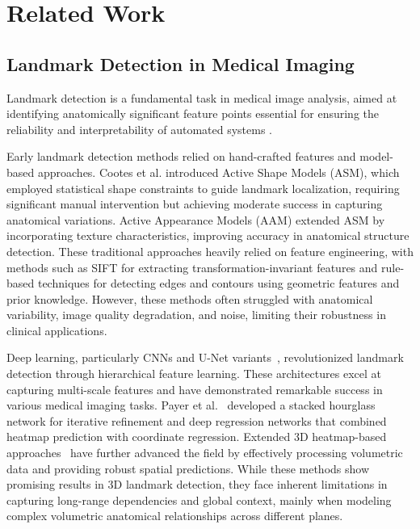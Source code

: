 \section{Related Work}
\label{sec.2}
\subsection{Landmark Detection in Medical Imaging}
Landmark detection is a fundamental task in medical image analysis, aimed at identifying anatomically significant feature points essential for ensuring the reliability and interpretability of automated systems \cite{regression}. 

Early landmark detection methods relied on hand-crafted features \cite{handcrafted1, handcrafted2, handcrafted3} and model-based approaches. Cootes et al. \cite{ASM} introduced Active Shape Models (ASM), which employed statistical shape constraints to guide landmark localization, requiring significant manual intervention but achieving moderate success in capturing anatomical variations. Active Appearance Models (AAM) \cite{AAM} extended ASM by incorporating texture characteristics, improving accuracy in anatomical structure detection. These traditional approaches heavily relied on feature engineering, with methods such as SIFT \cite{SIFT} for extracting transformation-invariant features and rule-based techniques \cite{ruled1, ruled2} for detecting edges and contours using geometric features and prior knowledge. However, these methods often struggled with anatomical variability, image quality degradation, and noise, limiting their robustness in clinical applications.


Deep learning, particularly CNNs and U-Net variants~\cite{PELE, king-Unet1, king-Unet2, huang2024retigan, shao2023diffuseexpand}, revolutionized landmark detection through hierarchical feature learning. These architectures excel at capturing multi-scale features and have demonstrated remarkable success in various medical imaging tasks. Payer et al.~\cite{SCN} developed a stacked hourglass network for iterative refinement and deep regression networks that combined heatmap prediction with coordinate regression. Extended 3D heatmap-based approaches~\cite{3D-CNN1-anchor, 3D-CNN2-sr} have further advanced the field by effectively processing volumetric data and providing robust spatial predictions. While these methods show promising results in 3D landmark detection, they face inherent limitations in capturing long-range dependencies and global context, mainly when modeling complex volumetric anatomical relationships across different planes.


